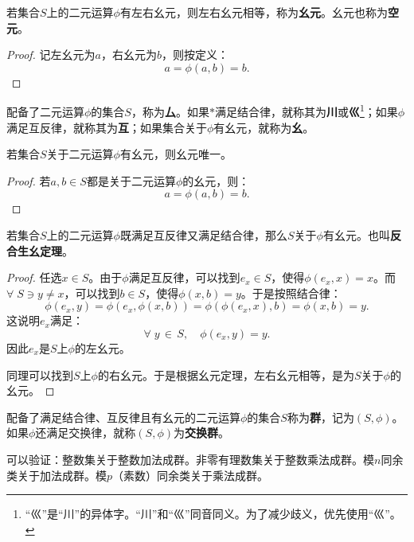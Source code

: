 \documentclass[12pt,UTF8,fontset=none]{ctexbook}
\begin{document}
\begin{tm}\label{tm:g-10}
    若集合$S$上的二元运算$\phi$有左右幺元，则左右幺元相等，称为\textbf{幺元}。幺元也称为\textbf{空元}。
\end{tm}
\begin{proof}
    记左幺元为$a$，右幺元为$b$，则按定义：
    $$ a = \phi(a,b) = b. $$ 
\end{proof}

\begin{df}
    配备了二元运算$\phi$的集合$S$，称为\textbf{厶}。如果$\ast$满足结合律，就称其为\textbf{川}或\textbf{巛}\footnote{“巛”是“川”的异体字。“川”和“巛”同音同义。为了减少歧义，优先使用“巛”。}；如果$\phi$满足互反律，就称其为\textbf{互}；如果集合关于$\phi$有幺元，就称为\textbf{幺}。
\end{df}

\begin{tm}\label{tm:g-20}
    若集合$S$关于二元运算$\phi$有幺元，则幺元唯一。
\end{tm}
\begin{proof}
    若$a,b\in S$都是关于二元运算$\phi$的幺元，则：
    $$ a = \phi(a,b) = b. $$ 
\end{proof}

\begin{tm}\label{tm:g-30}
    若集合$S$上的二元运算$\phi$既满足互反律又满足结合律，那么$S$关于$\phi$有幺元。也叫\textbf{反合生幺定理}。
\end{tm}
\begin{proof}
    任选$x\in S$。由于$\phi$满足互反律，可以找到$e_x\in S$，使得$\phi(e_x,x) = x$。而$\forall\; S\ni y\neq x$，可以找到$b\in S$，使得$\phi(x, b) = y$。于是按照结合律：
    $$ \phi(e_x, y) = \phi(e_x, \phi(x, b)) = \phi(\phi(e_x, x), b) = \phi(x, b) = y.$$
    这说明$e_x$满足：
    $$ \forall \; y\, \in \, S, \quad \phi(e_x, y) = y.$$
    因此$e_x$是$S$上$\phi$的左幺元。

    同理可以找到$S$上$\phi$的右幺元。于是根据幺元定理，左右幺元相等，是为$S$关于$\phi$的幺元。
\end{proof}

\begin{df}[\textbf{群}]
    配备了满足结合律、互反律且有幺元的二元运算$\phi$的集合$S$称为\textbf{群}，记为$(S,\phi)$。如果$\phi$还满足交换律，就称$(S,\phi)$为\textbf{交换群}。
\end{df}

\begin{ex}
    可以验证：整数集关于整数加法成群。非零有理数集关于整数乘法成群。模$n$同余类关于加法成群。模$p$（素数）同余类关于乘法成群。
\end{ex}
\end{document}
